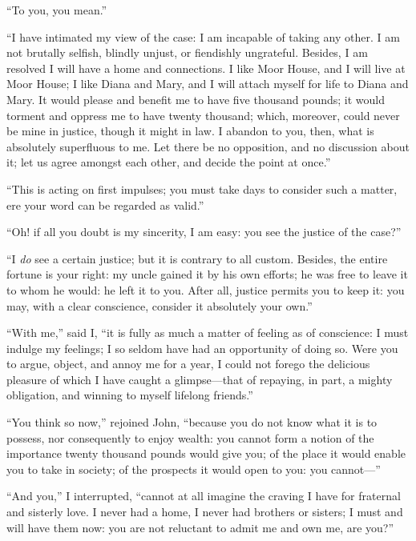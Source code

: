 \enquote{To you, you mean.}

\enquote{I have intimated my view of the case: I am incapable of taking
	any other. I am not brutally selfish, blindly unjust, or fiendishly
	ungrateful. Besides, I am resolved I will have a home and connections.
	I like Moor House, and I will live at Moor House; I like Diana and Mary,
	and I will attach myself for life to Diana and Mary. It would please
	and benefit me to have five thousand pounds; it would torment and
	oppress me to have twenty thousand; which, moreover, could never be mine
	in justice, though it might in law. I abandon to you, then, what is
	absolutely superfluous to me. Let there be no opposition, and no
	discussion about it; let us agree amongst each other, and decide the
	point at once.}

\enquote{This is acting on first impulses; you must take days to
	consider such a matter, ere your word can be regarded as valid.}

\enquote{Oh! if all you doubt is my sincerity, I am easy: you see the
	justice of the case?}

\enquote{I \emph{do} see a certain justice; but it is contrary to all custom.
	Besides, the entire fortune is your right: my uncle gained it by his own
	efforts; he was free to leave it to whom he would: he left it to you.
	After all, justice permits you to keep it: you may, with a clear
	conscience, consider it absolutely your own.}

\enquote{With me,} said I, \enquote{it is fully as much a matter of
	feeling as of conscience: I must indulge my feelings; I so seldom have
	had an opportunity of doing so. Were you to argue, object, and annoy me
	for a year, I could not forego the delicious pleasure of which I have
	caught a glimpse---that of repaying, in part, a mighty obligation, and
	winning to myself lifelong friends.}

\enquote{You think so now,} rejoined \St{} John, \enquote{because you do
	not know what it is to possess, nor consequently to enjoy wealth: you
	cannot form a notion of the importance twenty thousand pounds would give
	you; of the place it would enable you to take in society; of the
	prospects it would open to you: you cannot---}

\enquote{And you,} I interrupted, \enquote{cannot at all imagine the
	craving I have for fraternal and sisterly love. I never had a home, I
	never had brothers or sisters; I must and will have them now: you are
	not reluctant to admit me and own me, are you?}

